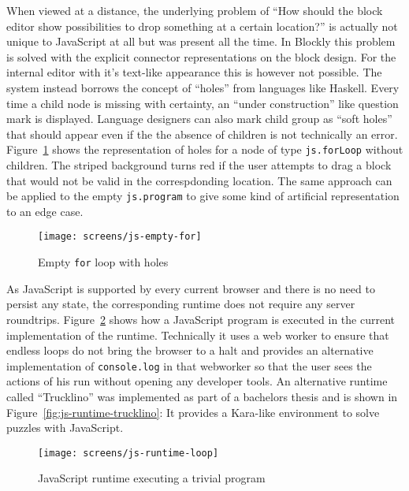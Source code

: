 \documentclass[sigconf,natbib=false,review=true,anonymous]{acmart}
\begin{document}
When viewed at a distance, the underlying problem of \enquote{How should the block editor show possibilities to drop something at a certain location?} is actually not unique to JavaScript at all but was present all the time. In Blockly this problem is solved with the explicit connector representations on the block design. For the internal editor with it's text-like appearance this is however not possible. The system instead borrows the concept of \enquote{holes} from languages like Haskell. Every time a child node is missing with certainty, an \enquote{under construction} like question mark is displayed. Language designers can also mark child group as \enquote{soft holes} that should appear even if the the absence of children is not technically an error. Figure~\ref{fig:screen-js-empty-for} shows the representation of holes for a node of type \texttt{js.forLoop} without children. The striped background turns red if the user attempts to drag a block that would not be valid in the correspdonding location. The same approach can be applied to the empty \texttt{js.program} to give some kind of artificial representation to an edge case.

\begin{figure}[H]
  \texttt{[image: screens/js-empty-for]}
  \caption{Empty \texttt{for} loop with holes}
  \label{fig:screen-js-empty-for}
\end{figure}

As JavaScript is supported by every current browser and there is no need to persist any state, the corresponding runtime does not require any server roundtrips. Figure~\ref{fig:screen-js-runtime-loop} shows how a JavaScript program is executed in the current implementation of the runtime. Technically it uses a web worker to ensure that endless loops do not bring the browser to a halt and provides an alternative implementation of \texttt{console.log} in that webworker so that the user sees the actions of his run without opening any developer tools. An alternative runtime called \enquote{Trucklino} was implemented as part of a bachelors thesis\cite{popp_konzeption_2019} and is shown in Figure~\ref{fig:js-runtime-trucklino}: It provides a Kara-like\cite{hartmann_kara_2001} environment to solve puzzles with JavaScript.

\begin{figure}
  \texttt{[image: screens/js-runtime-loop]}
  \caption{JavaScript runtime executing a trivial program}
  \label{fig:screen-js-runtime-loop}
\end{figure}
\end{document}
